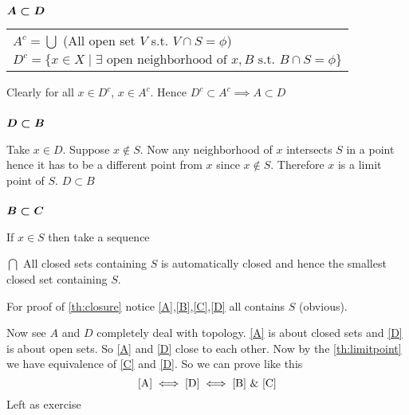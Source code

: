 \begin{myproof}
	\subsubsection*{$\boldsymbol{A\subset D}$}
		\begin{tabular}{l}\hspace{1.5cm}$A^c=\bigcup$ (All open set $V$ s.t. $V\cap S=\phi$) \\ \hspace{1.5cm}$D^c=\{x\in X\mid \exists \text{ open neighborhood of }x,B\text{ s.t. }B\cap S=\phi \}$\end{tabular}
		
		\setlength{\parindent}{0cm}Clearly for all $x\in D^c$, $x\in A^c$. Hence $D^c\subset A^c\implies A \subset D$\setlength{\parindent}{1cm}
		\subsubsection*{$\boldsymbol{D\subset B}$}
		Take $x\in D$. Suppose $x\notin S$. Now any neighborhood of $x$ intersects $S$ in a point hence it has to be a different point from $x$ since $x\notin S$. Therefore $x$ is a limit point of $S$. $D\subset B$
		\subsubsection*{$\boldsymbol{B\subset C}$}
		If $x\in S$ then take a sequence 
	
\end{myproof}

\sol $\bigcap$ All closed sets containing $S$ is automatically closed and hence the smallest closed set containing $S$.
\begin{myproof}
	For proof of \ref{th:closure} notice \ref{A},\ref{B},\ref{C},\ref{D} all contains $S$ (obvious).
	
	Now see $A$ and $D$ completely deal with topology. \ref{A} is about closed sets and \ref{D} is about open sets. So \ref{A} and \ref{D} close to each other. Now by the \ref{th:limitpoint} we have equivalence of \ref{C} and \ref{D}. So we can prove like this
	$$\ref{A}\iff\ref{D}\iff\ref{B}\ \&\ \ref{C}$$Left as exercise
\end{myproof}
